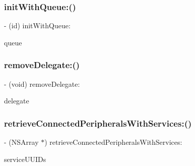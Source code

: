 \subsubsection{\texorpdfstring{init\+With\+Queue\+:()}{initWithQueue:()}}
{\footnotesize\ttfamily -\/ (id) init\+With\+Queue\+: \begin{DoxyParamCaption}\item[{(dispatch\+\_\+queue\+\_\+t)}]{queue }\end{DoxyParamCaption}}

\hypertarget{interfaceARSAL__CentralManager_a8cf717c255f5228ced0c72c3b0c20ff9}{}\label{interfaceARSAL__CentralManager_a8cf717c255f5228ced0c72c3b0c20ff9} 
\subsubsection{\texorpdfstring{remove\+Delegate\+:()}{removeDelegate:()}}
{\footnotesize\ttfamily -\/ (void) remove\+Delegate\+: \begin{DoxyParamCaption}\item[{(id$<$ C\+B\+Central\+Manager\+Delegate $>$)}]{delegate }\end{DoxyParamCaption}}

\hypertarget{interfaceARSAL__CentralManager_ae7e88c2aefe924068d9930e560716559}{}\label{interfaceARSAL__CentralManager_ae7e88c2aefe924068d9930e560716559} 
\subsubsection{\texorpdfstring{retrieve\+Connected\+Peripherals\+With\+Services\+:()}{retrieveConnectedPeripheralsWithServices:()}}
{\footnotesize\ttfamily -\/ (N\+S\+Array $\ast$) retrieve\+Connected\+Peripherals\+With\+Services\+: \begin{DoxyParamCaption}\item[{(N\+S\+Array $\ast$)}]{service\+U\+U\+I\+Ds }\end{DoxyParamCaption}}


